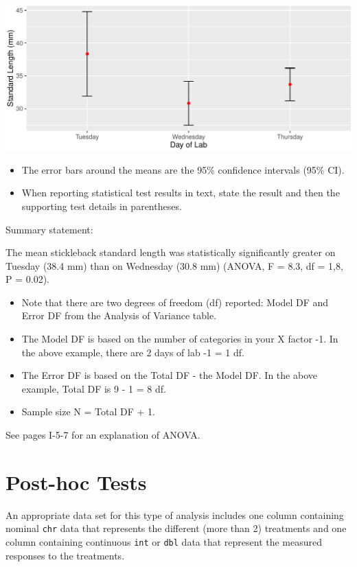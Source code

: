 \documentclass[twoside, 12pt]{article}
\begin{document}
\includegraphics{skeleton_files/figure-latex/unnamed-chunk-30-1.pdf}

\begin{itemize}
\item
  The error bars around the means are the 95\% confidence intervals
  (95\% CI).
\item
  When reporting statistical test results in text, state the result and
  then the supporting test details in parentheses.
\end{itemize}

Summary statement:

The mean stickleback standard length was statistically significantly
greater on Tuesday (38.4 mm) than on Wednesday (30.8 mm) (ANOVA, F =
8.3, df = 1,8, P = 0.02).

\begin{itemize}
\item
  Note that there are two degrees of freedom (df) reported: Model DF and
  Error DF from the Analysis of Variance table.
\item
  The Model DF is based on the number of categories in your X factor -1.
  In the above example, there are 2 days of lab -1 = 1 df.
\item
  The Error DF is based on the Total DF - the Model DF. In the above
  example, Total DF is 9 - 1 = 8 df.
\item
  Sample size N = Total DF + 1.
\end{itemize}

See pages I-5-7 for an explanation of ANOVA.

\section{Post-hoc Tests}\label{post-hoc-tests}

An appropriate data set for this type of analysis includes one column
containing nominal \texttt{chr} data that represents the different (more
than 2) treatments and one column containing continuous \texttt{int} or
\texttt{dbl} data that represent the measured responses to the
treatments.
\end{document}
